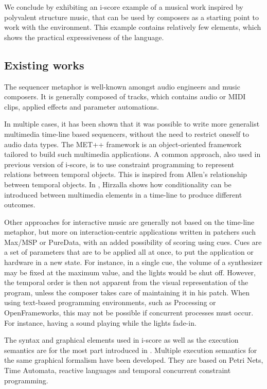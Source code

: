 \documentclass{article}
\begin{document}
We conclude by exhibiting an i-score example of a musical work inspired by polyvalent structure music,
that can be used by composers as a starting point to work with the environment. 
This example contains relatively few elements, which shows the practical expressiveness of the language.

\subsection{Existing works}
The sequencer metaphor is well-known amongst audio engineers and music composers. 
It is generally composed of tracks, which contains audio or MIDI clips, applied effects 
and parameter automations.

In multiple cases, it has been shown that it was possible to write 
more generalist multimedia time-line based sequencers, without the need to restrict oneself 
to audio data types. 
The MET++ framework\cite{ackermann1994direct} is an object-oriented framework 
tailored to build such multimedia applications.
A common approach, also used in previous version of i-score, is to use constraint programming 
to represent relations between temporal objects\cite{song1999interactive, allombert2006concurrent, toro2010concurrent}. 
This is inspired from Allen's relationship between temporal objects.
In \cite{hirzalla1995temporal}, Hirzalla shows how conditionality can be introduced between multimedia elements in a time-line to produce different outcomes.

Other approaches for interactive music are generally not based on the time-line metaphor, 
but more on interaction-centric applications written in patchers such Max/MSP or PureData, 
with an added possibility of scoring using cues. 
Cues are a set of parameters that are to be applied all at once, to put the application or hardware in a new state.
For instance, in a single cue, the volume of a synthesizer may be fixed at the maximum value, and the lights would be shut off.
However, the temporal order is then not apparent from the visual representation of the program, 
unless the composer takes care of maintaining it in his patch.
When using text-based programming environments, such as Processing or OpenFrameworks, this may not be possible if concurrent processes must occur. For instance, having a sound playing while the lights fade-in.

The syntax and graphical elements used in i-score as well as the 
execution semantics are for the most part introduced in \cite{celerier2015ossia, baltazar2014score}.
Multiple execution semantics for the same graphical formalism have been developed. 
They are based on Petri Nets\cite{allombert2007system}, Time Automata\cite{arias2015exploiting}, reactive languages\cite{arias2014executing} and temporal concurrent constraint programming\cite{toro2010model}.
\end{document}
